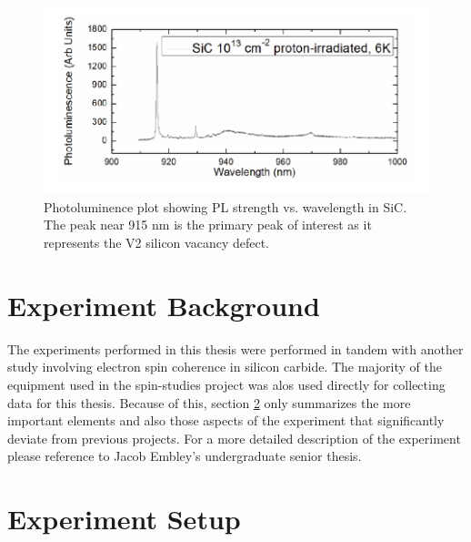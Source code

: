 \documentclass[oneside, noacknowlegments]{BYUPhys}
\begin{document}
\begin{figure}
    \centerline{\includegraphics{sic_pl_fig}}
    \caption[Photoluminence Spectra of Silicon Carbide]{\label{fig:SiCPL}
      Photoluminence plot showing PL strength vs. wavelength in SiC. The peak near 915 nm is the primary peak of interest as it represents the V2 silicon vacancy defect.}
 \end{figure}

\section{Experiment Background}

The experiments performed in this thesis were performed in tandem with another study involving electron spin coherence in silicon carbide. The majority of the equipment used in the spin-studies project was alos used directly for collecting data for this thesis. Because of this, section \ref{sec:Experiment} only summarizes the more important elements and also those aspects of the experiment that significantly deviate from previous projects. For a more detailed description of the experiment please reference to Jacob Embley's undergraduate senior thesis. \cite{RefWorks:doc:5892912ae4b0dec22aee3993}

\section{Experiment Setup}
\label{sec:Experiment}
\end{document}
